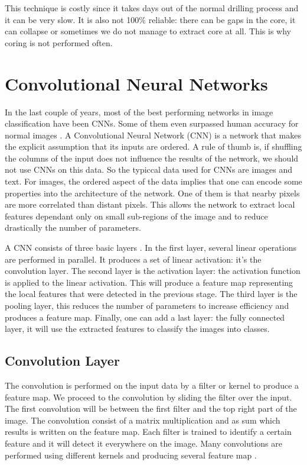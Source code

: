 This technique is costly since it takes days out of the normal drilling process and it can be very slow. It is also not 100\% reliable: there can be gaps in the core, it can collapse or sometimes we do not manage to extract core at all. This is why coring is not performed often. 

\section{Convolutional Neural Networks}
In the last couple of years, most of the best performing networks in image classification have been CNNs. Some of them even surpassed human accuracy for normal images \cite{humanDNN}.
A Convolutional Neural Network (CNN) is a network that makes the explicit assumption that its inputs are ordered. A rule of thumb is, if shuffling the columns of the input does not influence the results of the network, we should not use CNNs on this data. So the typiccal data used for CNNs are images and text. 
For images, the ordered aspect of the data implies that one can encode some properties into the architecture of the network. One of them is that nearby pixels are more correlated than distant pixels. This allows the network to extract local features dependant only on small sub-regions of the image and to reduce drastically the number of parameters. 


A CNN consists of three basic layers \cite{deepbook}.  In the first layer, several linear operations are performed in parallel. It produces a set of linear activation: it's the convolution layer. The second layer is the activation layer: the activation function is applied to the linear activation. This will produce a feature map representing the local features that were detected in the previous stage. The third layer is the pooling layer, this reduces the number of parameters to increase efficiency and produces a feature map. Finally, one can add a last layer: the fully connected layer, it will use the extracted features to classify the images into classes.


\subsection{Convolution Layer}

The convolution is performed on the input data by a filter or kernel to produce a feature map. We proceed to the convolution by sliding the filter over the input. The first convolution will be between the first filter and the top right part of the image. The convolution consist of a matrix multiplication and as sum which results is written on the feature map. Each filter is trained to identify a certain feature and it will detect it everywhere on the image.  Many convolutions are performed using different kernels and producing several feature map \cite{nnbook}.

